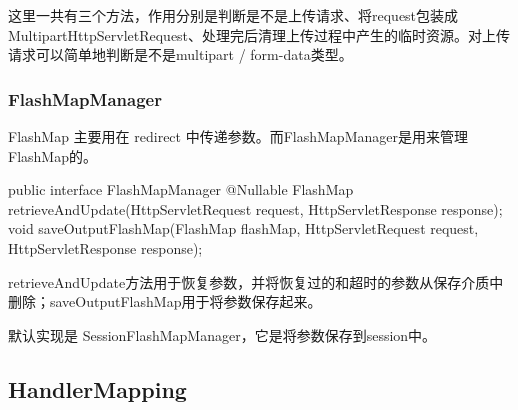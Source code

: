 这里一共有三个方法，作用分别是判断是不是上传请求、将request包装成MultipartHttpServletRequest、处理完后清理上传过程中产生的临时资源。对上传请求可以简单地判断是不是multipart / form-data类型。

\subsubsection*{FlashMapManager}

FlashMap 主要用在 redirect 中传递参数。而FlashMapManager是用来管理FlashMap的。

\begin{Java}
public interface FlashMapManager {
    @Nullable
    FlashMap retrieveAndUpdate(HttpServletRequest request, HttpServletResponse response);
    void saveOutputFlashMap(FlashMap flashMap, HttpServletRequest request, HttpServletResponse response);
}
\end{Java}

retrieveAndUpdate方法用于恢复参数，并将恢复过的和超时的参数从保存介质中删除；saveOutputFlashMap用于将参数保存起来。

默认实现是 SessionFlashMapManager，它是将参数保存到session中。

\subsection{HandlerMapping}

